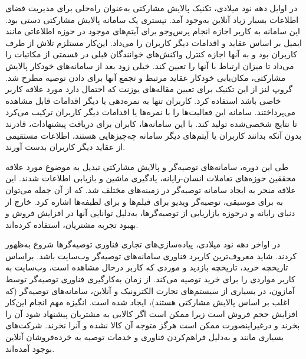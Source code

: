 در اوایل دهه نود میلادی، تکنیک پالایش مشارکتی
 به‌عنوان راه‌حلی برای مدیریت فضای اطلاعات بسیار زیاد آنلاین به‌وجود آمد. تپستری
یک سامانه پالایش مشارکتی دستی بود. این سامانه به کاربر اجازه انجام پرس‌وجو برای آیتم‌های موجود در حوزه اطلاعاتی مانند ایمیل بر اساس عقاید و اقدامات دیگر کاربران را می‌داد. این‌کار مستلزم تلاش از طرف کاربران بود و به آنها اجازه کنترل واکنش‌های خوانندگان قبلی در قسمتی از مکاتبات را می‌داد تا میزان ارتباط با آنها را تعیین کند. خیلی زود بعد از سامانه‌های خودکار پالایش مشارکتی، مکان‌یابی خودکار عقاید مرتبط و تجمع آنها برای دادن توصیه مطرح شد. گروپ لنز
از این تکنیک برای تعیین مقاله‌های یوزنت
که احتمال دارد مورد علاقه کاربر خاصی باشد استفاده کرد. کاربران تنها به نمره‌دهی یا دیگر اقدامات قابل مشاهده می‌پرداختند. سامانه این فعالیت‌ها را با نمره‌ها یا اقدامات دیگر کاربران ترکیب می‌کرد تا نتایج شخصی‌شده تولید کند. با این سامانه‌ها، کابران برای دریافت پیشنهادات، قادرند بدون آنکه بدانند کاربران یا آیتم‌های دیگر سامانه چه‌چیزهایی هستند، اطلاعات مستقیمی از عقاید دیگر کاربران بدست آورند.

طی این دوره، سامانه‌های توصیه‌گر و پالایش مشارکتی تبدیل به موضوع مورد علاقه محققین حوزه‌های تعاملات انسان-رایانه، یادگیری ماشین و بازیابی اطلاعات شدند. این علاقه منجر به ایجاد سامانه توصیه‌گر در زمینه‌های مختلف شد. که از آن جمله می‌توان به
برای موسیقی، توصیه‌گر ویدیو 
برای فیلم‌ها و 
برای لطیفه‌ها اشاره کرد. خارج از دنیای رایانه و درحوزه بازاریابی از توصیه‌گر‌ها، به‌دلیل توانایی آنها در افزایش فروش و بهبود تجربه مشتریان، استفاده کرده‌اند.

در اواخر دهه نود میلادی، پیاده‌سازی‌های تجاری فناوری توصیه‌گرها شروع به‌ظهور کردند. شاید معروف‌ترین کاربرد فناوری سامانه‌های توصیه‌گر وب‌سایت
باشد. براساس تاریخچه خرید، تاریخچه بازدید و موردی که کاربر درحال مشاهده است، وب‌سایت به کاربر مواردی را برای خرید توصیه می‌کند. از زمان به‌کارگیری فناوری توصیه‌گر توسط آمازون، در بسیاری از سیستم‌های تجارت الکترونیک و آنلاین، سامانه‌های توصیه‌گر (که اغلب بر اساس پالایش مشارکتی هستند)، ایجاد شده است. انگیزه مهم انجام این‌کار افزایش حجم فروش است زیرا ممکن است اگر کالا‌یی به مشتریان پیشنهاد شود آن را بخرند و درغیراینصورت ممکن است هرگز متوجه آن کالا نشده و آنرا نخرند. شرکت‌های بسیاری مانند 
و 
به‌دلیل فراهم‌کردن فناوری و خدمات توصیه به خرده‌فروشان آنلاین بوجود آمده‌اند.

